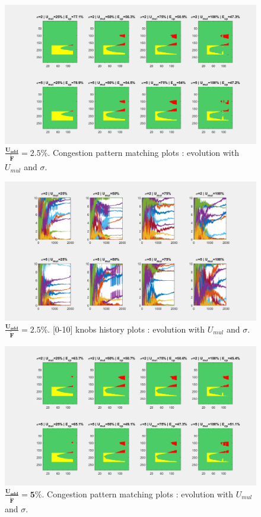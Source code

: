\begin{figure}[h]
	\label{fig:uaddcp25}
	\caption{$\mathbf{\frac{U_{add}}{\widetilde{F}}=2.5\%}$. Congestion pattern matching plots : evolution with $U_{mul}$ and $\sigma$.}
	\includegraphics[width=7in]{figures/results_figures/Uadd/cp_Uadd_25_lambda_11.png}
\end{figure}	
\begin{figure}[h]
	\label{fig:uaddknobs25}
	\caption{$\mathbf{\frac{U_{add}}{\widetilde{F}}=2.5\%}$. [0-10] knobs history plots : evolution with $U_{mul}$ and $\sigma$.}
	\includegraphics[width=7in]{figures/results_figures/Uadd/knobs_Uadd_25_lambda_11.png}
\end{figure}
\begin{figure}[h]
	\label{fig:uaddcp5}
	\caption{$\mathbf{\frac{U_{add}}{\widetilde{F}}=5\%}$. Congestion pattern matching plots : evolution with $U_{mul}$ and $\sigma$.}
	\includegraphics[width=7in]{figures/results_figures/Uadd/cp_Uadd_5_lambda_11.png}
\end{figure}	
